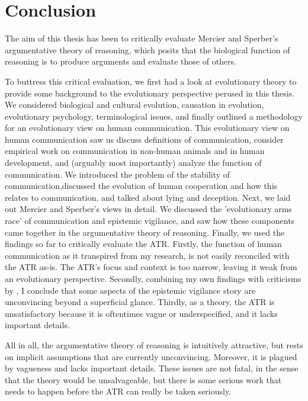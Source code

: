 \chapter{Conclusion}
\label{ch:conclusion}

The aim of this thesis has been to critically evaluate Mercier and Sperber's argumentative theory of reasoning, which posits that the biological function of reasoning is to produce arguments and evaluate those of others.

To buttress this critical evaluation, we first had a look at evolutionary theory to provide some background to the evolutionary perspective perused in this thesis.
We considered biological and cultural evolution, causation in evolution, evolutionary psychology, terminological issues, and finally outlined a methodology for an evolutionary view on human communication.
This evolutionary view on human communication saw us discuss definitions of communication, consider empirical work on communication in non-human animals and in human development, and (arguably most importantly) analyze the function of communication. We introduced the problem of the stability of communication,discussed the evolution of human cooperation and how this relates to communication, and talked about lying and deception.
Next, we laid out Mercier and Sperber's views in detail. We discussed the 'evolutionary arms race' of communication and epistemic vigilance, and saw how these components came together in the argumentative theory of reasoning.
Finally, we used the findings so far to critically evaluate the ATR. Firstly, the function of human communication as it transpired from my research, is not easily reconciled with the ATR as-is. The ATR's focus and context is too narrow, leaving it weak from an evolutionary perspective.
Secondly, combining my own findings with criticisms by \citet{Michaelian13}, I conclude that some aspects of the epistemic vigilance story are unconvincing beyond a superficial glance.
Thirdly, as a theory, the ATR is unsatisfactory because it is oftentimes vague or underspecified, and it lacks important details.

All in all, the argumentative theory of reasoning is intuitively attractive, but rests on implicit assumptions that are currently unconvincing. Moreover, it is plagued by vagueness and lacks important details. These issues are not fatal, in the sense that the theory would be unsalvageable, but there is some serious work that needs to happen before the ATR can really be taken seriously.

